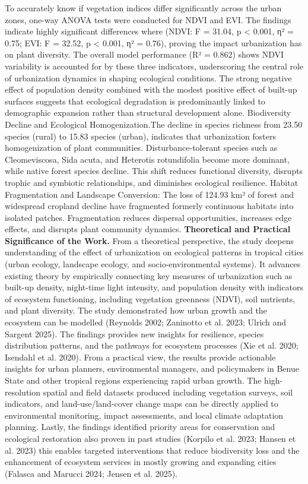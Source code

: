 To accurately know if vegetation indices differ significantly across the urban zones, one-way ANOVA tests were conducted for NDVI and EVI. The findings indicate highly significant differences where (NDVI: F = 31.04, p \textless{} 0.001, η² = 0.75; EVI: F = 32.52, p \textless{} 0.001, η² = 0.76), proving the impact urbanization has on plant diversity.
The overall model performance (R² = 0.862) shows NDVI variability is accounted for by these three indicators, underscoring the central role of urbanization dynamics in shaping ecological conditions. The strong negative effect of population density combined with the modest positive effect of built-up surfaces suggests that ecological degradation is predominantly linked to demographic expansion rather than structural development alone.
Biodiversity Decline and Ecological Homogenization.The decline in species richness from 23.50 species (rural) to 15.83 species (urban), indicates that urbanization fosters homogenization of plant communities. Disturbance-tolerant species such as Cleomeviscosa, Sida acuta, and Heterotis rotundifolia become more dominant, while native forest species decline. This shift reduces functional diversity, disrupts trophic and symbiotic relationships, and diminishes ecological resilience.
Habitat Fragmentation and Landscape Conversion: The loss of 124.93 km² of forest and widespread cropland decline have fragmented formerly continuous habitats into isolated patches. Fragmentation reduces dispersal opportunities, increases edge effects, and disrupts plant community dynamics.
\textbf{Theoretical and Practical Significance of the Work.} From a theoretical perspective, the study deepens understanding of the effect of urbanization on ecological patterns in tropical cities (urban ecology, landscape ecology, and socio-environmental systems). It advances existing theory by empirically connecting key measures of urbanization such as built-up density, night-time light intensity, and population density with indicators of ecosystem functioning, including vegetation greenness (NDVI), soil nutrients, and plant diversity. The study demonstrated how urban growth and the ecosystem can be modelled (Reynolds 2002; Zaninotto et al. 2023; Ulrich and Sargent 2025). The findings provides new insights for resilience, species distribution patterns, and the pathways for ecosystem processes (Xie et al. 2020; Isendahl et al. 2020).
From a practical view, the results provide actionable insights for urban planners, environmental managers, and policymakers in Benue State and other tropical regions experiencing rapid urban growth. The high-resolution spatial and field datasets produced including vegetation surveys, soil indicators, and land-use/land-cover change maps can be directly applied to environmental monitoring, impact assessments, and local climate adaptation planning. Lastly, the findings identified priority areas for conservation and ecological restoration also proven in past studies (Korpilo et al. 2023; Hansen et al. 2023) this enables targeted interventions that reduce biodiversity loss and the enhancement of ecosystem services in mostly growing and expanding cities (Falasca and Marucci 2024; Jensen et al. 2025).
